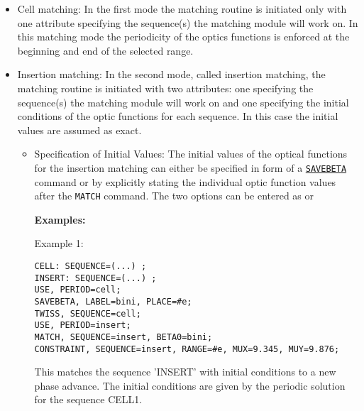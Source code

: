 \begin{itemize}
  \item Cell matching:
    In the first mode the matching routine is initiated only with one
    attribute specifying the sequence(s) the matching module will work
    on. In this matching mode the periodicity of the optics functions is
    enforced at the beginning and end of the selected range. 
    
  \item Insertion matching:
    In the second mode, called insertion matching, the matching routine is
    initiated with two attributes: one specifying the sequence(s) the
    matching module will work on and one specifying the initial conditions
    of the optic functions for each sequence. In this case the initial
    values are assumed as exact. 
 
    \begin{itemize}
      \item Specification of Initial Values: The initial values of the optical
        functions  for the insertion matching can either be specified in form of
        a \hyperref[sec:savebeta]{\tt SAVEBETA} command or by
        explicitly stating the individual optic function values after the
        {\tt MATCH} command. The two options can be entered as         
        or

{\bf Examples:}
 
Example 1:
\begin{verbatim}
CELL: SEQUENCE=(...) ;
INSERT: SEQUENCE=(...) ;
USE, PERIOD=cell;
SAVEBETA, LABEL=bini, PLACE=#e;
TWISS, SEQUENCE=cell;
USE, PERIOD=insert;
MATCH, SEQUENCE=insert, BETA0=bini;
CONSTRAINT, SEQUENCE=insert, RANGE=#e, MUX=9.345, MUY=9.876;
\end{verbatim}
This matches the sequence 'INSERT' with initial conditions to a new
phase advance. The initial conditions are given by the periodic solution
for the sequence CELL1. 


\end{itemize}
\end{itemize}
